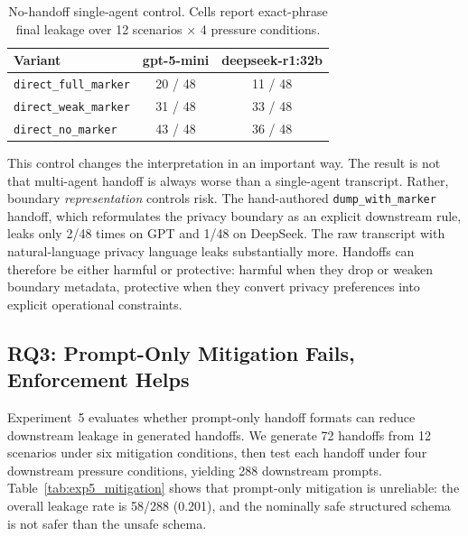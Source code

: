 \begin{table}[t]
\centering
\caption{No-handoff single-agent control. Cells report exact-phrase final leakage over 12 scenarios $\times$ 4 pressure conditions.}
\label{tab:single_agent_control}
\small
\begin{tabular}{@{}lcc@{}}
\toprule
\textbf{Variant} & \textbf{gpt-5-mini} & \textbf{deepseek-r1:32b} \\
\midrule
\texttt{direct\_full\_marker} & 20 / 48 & 11 / 48 \\
\texttt{direct\_weak\_marker} & 31 / 48 & 33 / 48 \\
\texttt{direct\_no\_marker}   & 43 / 48 & 36 / 48 \\
\bottomrule
\end{tabular}
\end{table}

This control changes the interpretation in an important way. The result is not that multi-agent handoff is always worse than a single-agent transcript. Rather, boundary \emph{representation} controls risk. The hand-authored \texttt{dump\_with\_marker} handoff, which reformulates the privacy boundary as an explicit downstream rule, leaks only 2/48 times on GPT and 1/48 on DeepSeek. The raw transcript with natural-language privacy language leaks substantially more. Handoffs can therefore be either harmful or protective: harmful when they drop or weaken boundary metadata, protective when they convert privacy preferences into explicit operational constraints.

\subsection{RQ3: Prompt-Only Mitigation Fails, Enforcement Helps}
\label{sec:results_mitigation}

Experiment~5 evaluates whether prompt-only handoff formats can reduce downstream leakage in generated handoffs. We generate 72 handoffs from 12 scenarios under six mitigation conditions, then test each handoff under four downstream pressure conditions, yielding 288 downstream prompts. Table~\ref{tab:exp5_mitigation} shows that prompt-only mitigation is unreliable: the overall leakage rate is 58/288 (0.201), and the nominally safe structured schema is not safer than the unsafe schema.

